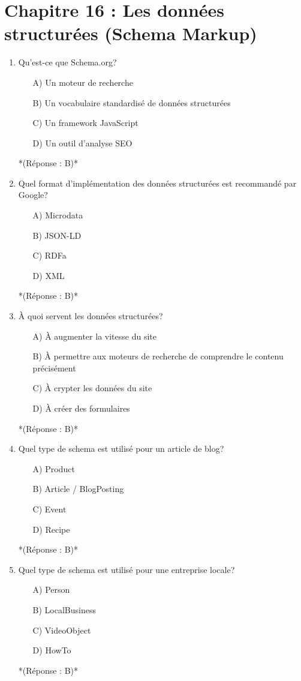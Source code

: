 \documentclass[12pt,a4paper,twoside]{report}
\begin{document}
\section*{Chapitre 16 : Les données structurées (Schema Markup)}

\begin{enumerate}
\item Qu'est-ce que Schema.org?
\begin{itemize}
\item[A)] Un moteur de recherche
\item[B)] Un vocabulaire standardisé de données structurées
\item[C)] Un framework JavaScript
\item[D)] Un outil d'analyse SEO
\end{itemize}
*(Réponse : B)*

\item Quel format d'implémentation des données structurées est recommandé par Google?
\begin{itemize}
\item[A)] Microdata
\item[B)] JSON-LD
\item[C)] RDFa
\item[D)] XML
\end{itemize}
*(Réponse : B)*

\item À quoi servent les données structurées?
\begin{itemize}
\item[A)] À augmenter la vitesse du site
\item[B)] À permettre aux moteurs de recherche de comprendre le contenu précisément
\item[C)] À crypter les données du site
\item[D)] À créer des formulaires
\end{itemize}
*(Réponse : B)*

\item Quel type de schema est utilisé pour un article de blog?
\begin{itemize}
\item[A)] Product
\item[B)] Article / BlogPosting
\item[C)] Event
\item[D)] Recipe
\end{itemize}
*(Réponse : B)*

\item Quel type de schema est utilisé pour une entreprise locale?
\begin{itemize}
\item[A)] Person
\item[B)] LocalBusiness
\item[C)] VideoObject
\item[D)] HowTo
\end{itemize}
*(Réponse : B)*


\end{enumerate}
\end{document}
